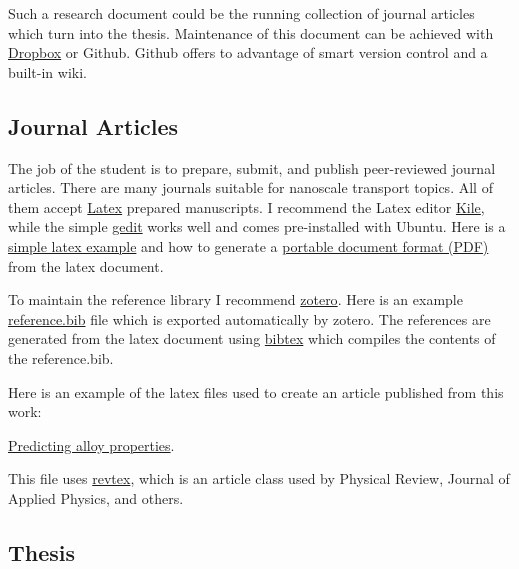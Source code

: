 Such a research document could be the running 
collection of journal articles which turn into the thesis. Maintenance 
of this document can be achieved with 
\href{https://www.dropbox.com/}{Dropbox} or 
Github. 
Github offers to advantage of smart version control and a built-in 
wiki. 



\subsection{Journal Articles}

The job of the student is to prepare, submit, and publish 
peer-reviewed journal articles. There are many journals suitable for 
nanoscale transport topics. All of them accept 
\href{http://www.latex-project.org/}{Latex} prepared manuscripts. 
I recommend the Latex editor 
\href{http://kile.sourceforge.net/}{Kile}, while the simple 
\href{https://projects.gnome.org/gedit/}{gedit} works well and comes 
pre-installed with Ubuntu. Here is a 
\href{http://mally.stanford.edu/~sr/computing/latex-example.html}
{simple latex example} and how to generate a 
\href{http://tex.stackexchange.com/questions/1596/how-to-compile-a-latex-document}
{portable document format (PDF)} from the latex document.  

To maintain the reference library I 
recommend 
\href{http://www.zotero.org/}{zotero}.  Here is an example 
\href{}{reference.bib} 
file which is exported automatically by zotero. 
The references are generated from the latex document using 
\href{http://www.bibtex.org/Using/}{bibtex} which compiles the contents of 
the reference.bib.

Here is an example of the latex files 
used to create an article published from this work:

\href{https://github.com/jasonlarkin/thesis/tree/master/thesis}
{Predicting alloy properties}.

This file uses 
\href{http://publish.aps.org/revtex}{revtex}, 
which is an article class used by Physical Review, 
Journal of Applied Physics, and others.

\subsection{Thesis}

